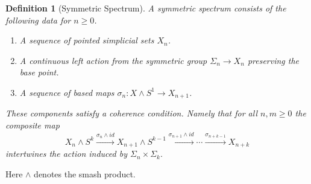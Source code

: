 \documentclass[12pt]{report}
\numberwithin{equation}{section}
\newtheorem{definition}[dummy]{Definition}
\begin{document}
	\begin{definition}[Symmetric Spectrum]
		A {symmetric spectrum} consists of the following data for \( n  \geq 0 \).
		\begin{enumerate}
			\item A sequence of pointed simplicial sets \( X_n \).
			\item A continuous left action from the symmetric group \( \Sigma_n \to X_n \) preserving the base point.
			\item A sequence of based maps \( \sigma_n: X \wedge S^1 \to X_{n+1} \).
		\end{enumerate}
		These components satisfy a coherence condition. Namely that for all \( n,m \geq 0 \) the composite map 
		\[ X_n \wedge S^{k} \stackrel{\sigma_n \wedge id}{\longrightarrow} X_{n+1} \wedge S^{k-1} \stackrel{\sigma_{n+1}\wedge id}{\longrightarrow} \cdots \stackrel{\sigma_{n+k-1}}{\longrightarrow} X_{n+k} \] intertwines the action induced by \( \Sigma_n \times \Sigma_k. \)
	\end{definition}
	
	Here \( \wedge \) denotes the smash product.	
	
\end{document}
